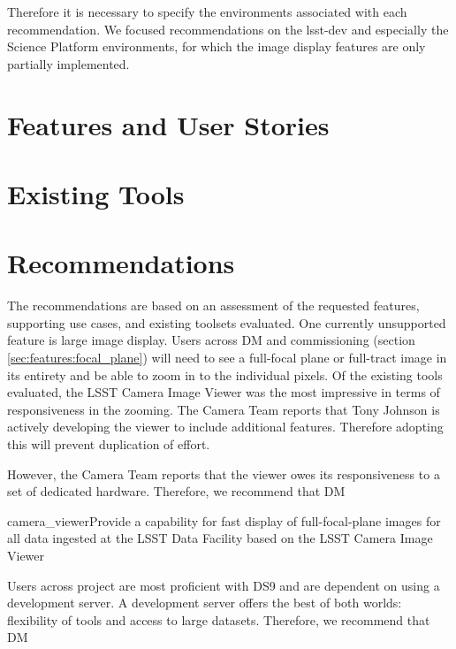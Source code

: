 \documentclass[DM,authoryear,toc]{lsstdoc}
\begin{document}
Therefore it is necessary to specify the environments associated with each recommendation.
We focused recommendations on the lsst-dev and especially the Science Platform environments, for which the image display features are only partially implemented.

\section{Features and User Stories}
\label{sec:features}


\section{Existing Tools}
\label{sec:tools}


\section{Recommendations}
\label{sec:conc}

The recommendations are based on an assessment of the requested features, supporting use cases, and existing toolsets evaluated.
One currently unsupported feature is large image display.
Users across DM and commissioning (section \ref{sec:features:focal_plane}) will need to see a full-focal plane or full-tract image in its entirety and be able to zoom in to the individual pixels.
Of the existing tools evaluated, the LSST Camera Image Viewer was the most impressive in terms of responsiveness in the zooming.
The Camera Team reports that Tony Johnson is actively developing the viewer to include additional features.
Therefore adopting this will prevent duplication of effort.

However, the Camera Team reports that the viewer owes its responsiveness to a set of dedicated hardware.
Therefore, we recommend that DM
\begin{recommendation}{camera_viewer}{Provide a capability for fast display of full-focal-plane images for all data ingested at the LSST Data Facility based on the LSST Camera Image Viewer}
\end{recommendation}

Users across project are most proficient with DS9 and are dependent on using a development server. A development server offers the best of both worlds: flexibility of tools and access to large datasets.  Therefore, we recommend that DM
\end{document}

